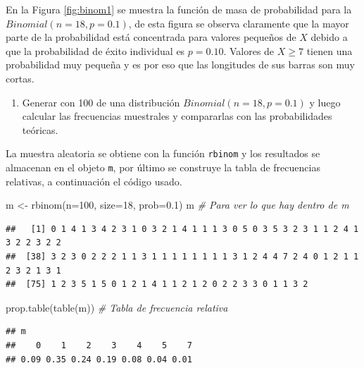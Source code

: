 \documentclass[
]{book}
\makeatletter
\newenvironment{Shaded}{\begin{snugshade}}{\end{snugshade}}
\newcommand{\AttributeTok}[1]{\textcolor[rgb]{0.77,0.63,0.00}{#1}}
\newcommand{\CommentTok}[1]{\textcolor[rgb]{0.56,0.35,0.01}{\textit{#1}}}
\newcommand{\DecValTok}[1]{\textcolor[rgb]{0.00,0.00,0.81}{#1}}
\newcommand{\FloatTok}[1]{\textcolor[rgb]{0.00,0.00,0.81}{#1}}
\newcommand{\FunctionTok}[1]{\textcolor[rgb]{0.00,0.00,0.00}{#1}}
\newcommand{\NormalTok}[1]{#1}
\newcommand{\OtherTok}[1]{\textcolor[rgb]{0.56,0.35,0.01}{#1}}
\providecommand{\tightlist}{%
  \setlength{\itemsep}{0pt}\setlength{\parskip}{0pt}}
\newenvironment{kframe}{%
\medskip{}
\setlength{\fboxsep}{.8em}
 \def\at@end@of@kframe{}%
 \ifinner\ifhmode%
  \def\at@end@of@kframe{\end{minipage}}%
  \begin{minipage}{\columnwidth}%
 \fi\fi%
 \def\FrameCommand##1{\hskip\@totalleftmargin \hskip-\fboxsep
 \colorbox{shadecolor}{##1}\hskip-\fboxsep
     \hskip-\linewidth \hskip-\@totalleftmargin \hskip\columnwidth}%
 \MakeFramed {\advance\hsize-\width
   \@totalleftmargin\z@ \linewidth\hsize
   \@setminipage}}%
 {\par\unskip\endMakeFramed%
 \at@end@of@kframe}
\renewenvironment{Shaded}{\begin{kframe}}{\end{kframe}}
\makeatother
\begin{document}
En la Figura \ref{fig:binom1} se muestra la función de masa de probabilidad para la \(Binomial(n=18, p=0.1)\), de esta figura se observa claramente que la mayor parte de la probabilidad está concentrada para valores pequeños de \(X\) debido a que la probabilidad de éxito individual es \(p=0.10\). Valores de \(X \geq 7\) tienen una probabilidad muy pequeña y es por eso que las longitudes de sus barras son muy cortas.

\begin{enumerate}
\def\labelenumi{\arabic{enumi})}
\setcounter{enumi}{4}
\tightlist
\item
  Generar con 100 de una distribución \(Binomial(n=18, p=0.1)\) y luego calcular las frecuencias muestrales y compararlas con las probabilidades teóricas.
\end{enumerate}

La muestra aleatoria se obtiene con la función \texttt{rbinom} y los resultados se almacenan en el objeto \texttt{m}, por último se construye la tabla de frecuencias relativas, a continuación el código usado.

\begin{Shaded}
\begin{Highlighting}[]
\NormalTok{m }\OtherTok{\textless{}{-}} \FunctionTok{rbinom}\NormalTok{(}\AttributeTok{n=}\DecValTok{100}\NormalTok{, }\AttributeTok{size=}\DecValTok{18}\NormalTok{, }\AttributeTok{prob=}\FloatTok{0.1}\NormalTok{)}
\NormalTok{m  }\CommentTok{\# Para ver lo que hay dentro de m}
\end{Highlighting}
\end{Shaded}

\begin{verbatim}
##   [1] 0 1 4 1 3 4 2 3 1 0 3 2 1 4 1 1 1 3 0 5 0 3 5 3 2 3 1 1 2 4 1 3 2 2 3 2 2
##  [38] 3 2 3 0 2 2 2 1 1 3 1 1 1 1 1 1 1 1 3 1 2 4 4 7 2 4 0 1 2 1 1 2 3 2 1 3 1
##  [75] 1 2 3 5 1 5 0 1 2 1 4 1 1 2 1 2 0 2 2 3 3 0 1 1 3 2
\end{verbatim}

\begin{Shaded}
\begin{Highlighting}[]
\FunctionTok{prop.table}\NormalTok{(}\FunctionTok{table}\NormalTok{(m))  }\CommentTok{\# Tabla de frecuencia relativa}
\end{Highlighting}
\end{Shaded}

\begin{verbatim}
## m
##    0    1    2    3    4    5    7 
## 0.09 0.35 0.24 0.19 0.08 0.04 0.01
\end{verbatim}
\end{document}
